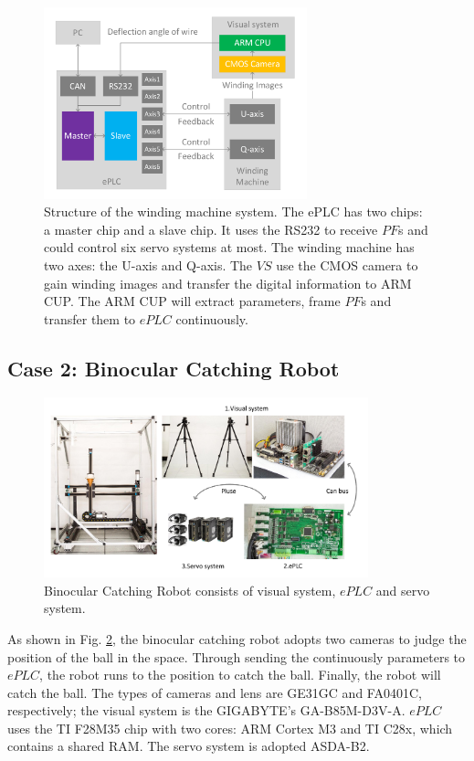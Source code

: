 \documentclass[journal,UTF8]{IEEEtran}
\begin{document}
\begin{figure}
	\centering
	\includegraphics[width=3in]{fig/WindingSystem.pdf}
	\caption{ Structure of the winding machine system. The ePLC has two chips: a master chip and a slave chip. It uses the RS232 to receive $PF$s and could control six servo systems at most. The winding machine has two axes: the U-axis and Q-axis. The $VS$ use the CMOS camera to gain winding images and transfer the digital information to ARM CUP. The ARM CUP will extract parameters, frame $PF$s and transfer them to $ePLC$ continuously.}
	\label{fig:WindingSystem}
\end{figure}
\subsection{Case 2: Binocular Catching Robot}
\begin{figure}
	\centering
	\includegraphics[width=3.7in]{fig/robot.pdf}
	\caption{ Binocular Catching Robot consists of visual system, $ePLC$ and servo system.}
	\label{fig:robot}
\end{figure}
As shown in Fig. \ref{fig:robot}, the binocular catching robot adopts two cameras to judge the position of the ball in the space. Through sending the continuously parameters to $ePLC$, the robot runs to the position to catch the ball. Finally, the robot will catch the ball. The types of cameras and lens are GE31GC and FA0401C, respectively; the visual system is the GIGABYTE's GA-B85M-D3V-A. $ePLC$ uses the TI F28M35 chip with two cores: ARM Cortex M3 and TI C28x, which contains a shared RAM. The servo system is adopted ASDA-B2. 
\end{document}
